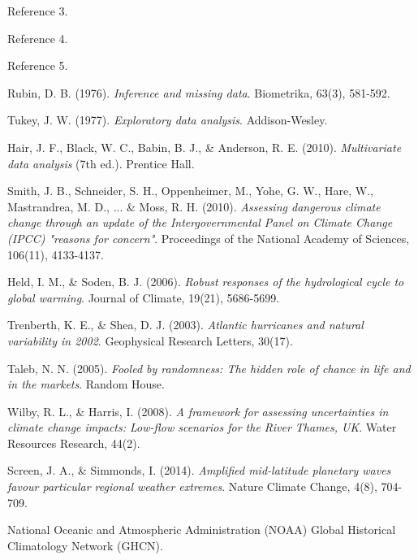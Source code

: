 \documentclass{article}
\begin{document}
\begin{thebibliography}{10}
Reference 3.

Reference 4.

Reference 5.

Rubin, D. B. (1976).
\textit{Inference and missing data}.
Biometrika, 63(3), 581-592.

Tukey, J. W. (1977).
\textit{Exploratory data analysis}.
Addison-Wesley.

Hair, J. F., Black, W. C., Babin, B. J., \& Anderson, R. E. (2010).
\textit{Multivariate data analysis} (7th ed.).
Prentice Hall.

Smith, J. B., Schneider, S. H., Oppenheimer, M., Yohe, G. W., Hare, W., Mastrandrea, M. D., ... \& Moss, R. H. (2010).
\textit{Assessing dangerous climate change through an update of the Intergovernmental Panel on Climate Change (IPCC) "reasons for concern"}.
Proceedings of the National Academy of Sciences, 106(11), 4133-4137.

Held, I. M., \& Soden, B. J. (2006).
\textit{Robust responses of the hydrological cycle to global warming}.
Journal of Climate, 19(21), 5686-5699.

Trenberth, K. E., \& Shea, D. J. (2003).
\textit{Atlantic hurricanes and natural variability in 2002}.
Geophysical Research Letters, 30(17).

Taleb, N. N. (2005).
\textit{Fooled by randomness: The hidden role of chance in life and in the markets}.
Random House.

Wilby, R. L., \& Harris, I. (2008).
\textit{A framework for assessing uncertainties in climate change impacts: Low-flow scenarios for the River Thames, UK}.
Water Resources Research, 44(2).

Screen, J. A., \& Simmonds, I. (2014).
\textit{Amplified mid-latitude planetary waves favour particular regional weather extremes}.
Nature Climate Change, 4(8), 704-709.

National Oceanic and Atmospheric Administration (NOAA) Global Historical Climatology Network (GHCN).


\end{thebibliography}
\end{document}

